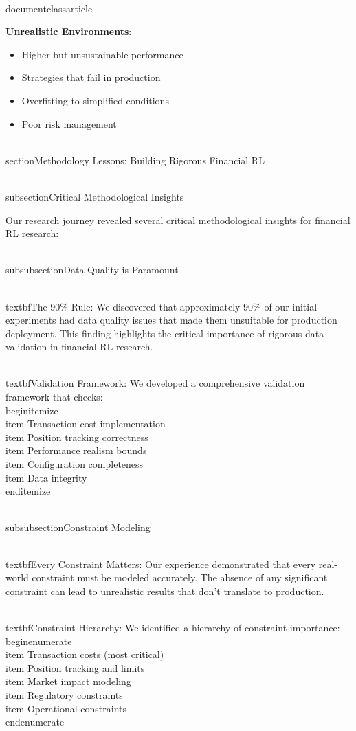 \\documentclass{article}
\begin{document}
\textbf{Unrealistic Environments}:
\begin{itemize}
\item Higher but unsustainable performance
\item Strategies that fail in production
\item Overfitting to simplified conditions
\item Poor risk management
\end{itemize}
\n\n
\\section{Methodology Lessons: Building Rigorous Financial RL}

\\subsection{Critical Methodological Insights}

Our research journey revealed several critical methodological insights for financial RL research:

\\subsubsection{Data Quality is Paramount}

\\textbf{The 90\% Rule}: We discovered that approximately 90\% of our initial experiments had data quality issues that made them unsuitable for production deployment. This finding highlights the critical importance of rigorous data validation in financial RL research.

\\textbf{Validation Framework}: We developed a comprehensive validation framework that checks:
\\begin{itemize}
\\item Transaction cost implementation
\\item Position tracking correctness
\\item Performance realism bounds
\\item Configuration completeness
\\item Data integrity
\\end{itemize}

\\subsubsection{Constraint Modeling}

\\textbf{Every Constraint Matters}: Our experience demonstrated that every real-world constraint must be modeled accurately. The absence of any significant constraint can lead to unrealistic results that don't translate to production.

\\textbf{Constraint Hierarchy}: We identified a hierarchy of constraint importance:
\\begin{enumerate}
\\item Transaction costs (most critical)
\\item Position tracking and limits
\\item Market impact modeling
\\item Regulatory constraints
\\item Operational constraints
\\end{enumerate}
\end{document}

